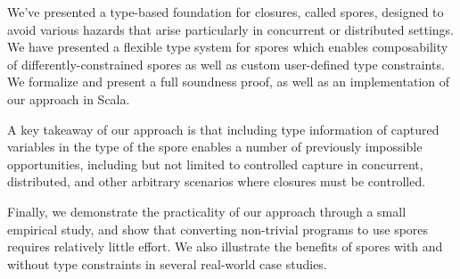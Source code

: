 \documentclass{llncs}
\begin{document}
We've presented a type-based foundation for closures, called spores, designed
to avoid various hazards that arise particularly in concurrent or distributed
settings. We have presented a flexible type system for spores which enables
composability of differently-constrained spores as well as custom user-defined
type constraints. We formalize and present a full soundness proof, as well as
an implementation of our approach in Scala.

A key takeaway of our approach is that including type information of captured
variables in the type of the spore enables a number of previously impossible
opportunities, including but not limited to controlled capture in concurrent,
distributed, and other arbitrary scenarios where closures must be
controlled.

Finally, we demonstrate the practicality of our approach through a small
empirical study, and show that converting non-trivial
programs to use spores requires relatively little effort. We also illustrate
the benefits of spores with and without type constraints in several real-world
case studies.











\end{document}

